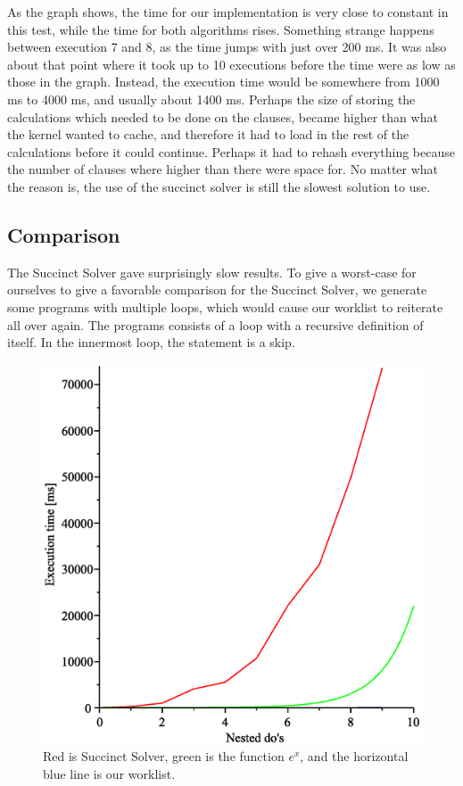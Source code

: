 As the graph shows, the time for our implementation is very close to constant in this test, while the time for both algorithms rises. Something strange happens between execution 7 and 8, as the time jumps with just over 200 ms. It was also about that point where it took up to 10 executions before the time were as low as those in the graph. Instead, the execution time would be somewhere from 1000 ms to 4000 ms, and usually about 1400 ms. Perhaps the size of storing the calculations which needed to be done on the clauses, became higher than what the kernel wanted to cache, and therefore it had to load in the rest of the calculations before it could continue. Perhaps it had to rehash everything because the number of clauses where higher than there were space for. No matter what the reason is, the use of the succinct solver is still the slowest solution to use.

\subsection{Comparison}

The Succinct Solver gave surprisingly slow results. To give a worst-case for ourselves
to give a favorable comparison for the Succinct Solver, we generate some programs with
multiple loops, which would cause our worklist to reiterate all over again. The programs
consists of a loop with a recursive definition of itself. In the innermost loop, the statement
is a skip.

\begin{figure}
\includegraphics[width=1\textwidth]{alfp_nested_do_graph.eps}
\caption{Red is Succinct Solver, green is the function $e^x$, and the horizontal blue line is our worklist.}
\end{figure}


